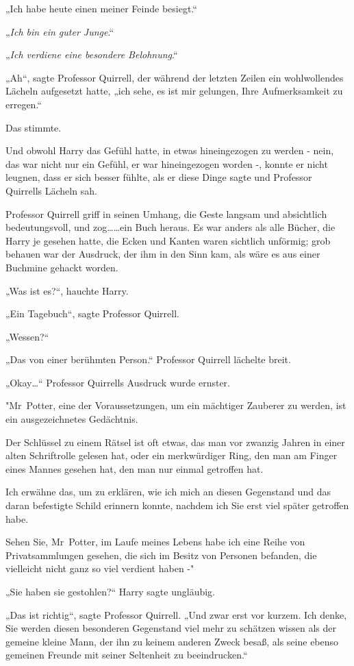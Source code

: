 {„Ich habe heute einen meiner Feinde besiegt.“

„\emph{Ich bin ein guter Junge}.“

„\emph{Ich verdiene eine besondere Belohnung}.“

„Ah“, sagte Professor Quirrell, der während der letzten Zeilen ein wohlwollendes Lächeln aufgesetzt hatte, „ich sehe, es ist mir gelungen, Ihre Aufmerksamkeit zu erregen.“

Das stimmte.

Und obwohl Harry das Gefühl hatte, in etwas hineingezogen zu werden - nein, das war nicht nur ein Gefühl, er war hineingezogen worden -, konnte er nicht leugnen, dass er sich besser fühlte, als er diese Dinge sagte und Professor Quirrells Lächeln sah.

Professor Quirrell griff in seinen Umhang, die Geste langsam und absichtlich bedeutungsvoll, und zog……ein Buch heraus. Es war anders als alle Bücher, die Harry je gesehen hatte, die Ecken und Kanten waren sichtlich unförmig; grob behauen war der Ausdruck, der ihm in den Sinn kam, als wäre es aus einer Buchmine gehackt worden.

„Was ist es?“, hauchte Harry.

„Ein Tagebuch“, sagte Professor Quirrell.

„Wessen?“

„Das von einer berühmten Person.“ Professor Quirrell lächelte breit.

„Okay…“ Professor Quirrells Ausdruck wurde ernster.

"Mr~Potter, eine der Voraussetzungen, um ein mächtiger Zauberer zu werden, ist ein ausgezeichnetes Gedächtnis.

Der Schlüssel zu einem Rätsel ist oft etwas, das man vor zwanzig Jahren in einer alten Schriftrolle gelesen hat, oder ein merkwürdiger Ring, den man am Finger eines Mannes gesehen hat, den man nur einmal getroffen hat.

Ich erwähne das, um zu erklären, wie ich mich an diesen Gegenstand und das daran befestigte Schild erinnern konnte, nachdem ich Sie erst viel später getroffen habe.

Sehen Sie, Mr~Potter, im Laufe meines Lebens habe ich eine Reihe von Privatsammlungen gesehen, die sich im Besitz von Personen befanden, die vielleicht nicht ganz so viel verdient haben -"

„Sie haben sie gestohlen?“ Harry sagte ungläubig.

„Das ist richtig“, sagte Professor Quirrell. „Und zwar erst vor kurzem. Ich denke, Sie werden diesen besonderen Gegenstand viel mehr zu schätzen wissen als der gemeine kleine Mann, der ihn zu keinem anderen Zweck besaß, als seine ebenso gemeinen Freunde mit seiner Seltenheit zu beeindrucken.“

}
